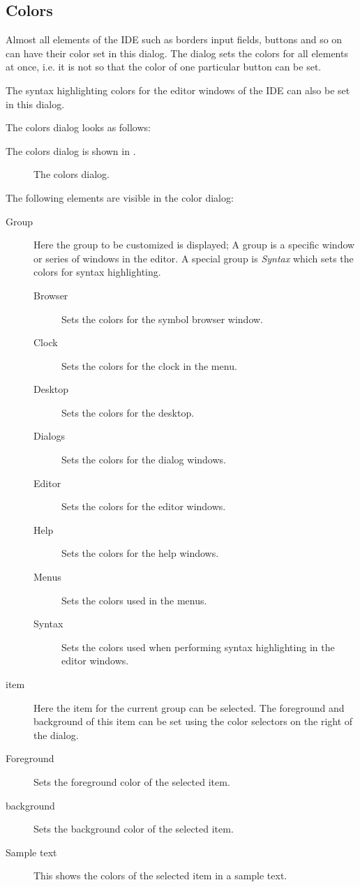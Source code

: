 %
%
\subsection{Colors}
\label{se:prefcolors}
Almost all elements of the IDE such as borders input fields, buttons and so
on can have their color set in this dialog. The dialog sets the colors for
all elements at once, i.e. it is not so that the color of one particular
button can be set.

The syntax highlighting colors for the editor windows of the IDE can also 
be set in this dialog.
\begin{htmlonly}
The colors dialog looks as follows:
\end{htmlonly}
\begin{latexonly}
The colors dialog is shown in .
\begin{figure}[ht]
\begin{center}
\caption{The colors dialog.}\label{fig:ocolors}
\ifpdf
{}
\else
{}
\fi
\end{center}
\end{figure}
\end{latexonly}
The following elements are visible in the color dialog:
\begin{description}
\item[Group]
Here the group to be customized is displayed; A group is a specific window
or series of windows in the editor. A special group is {\em Syntax} which
sets the colors for syntax highlighting.
\begin{description}
\item[Browser] Sets the colors for the symbol browser window.
\item[Clock] Sets the colors for the clock in the menu.
\item[Desktop] Sets the colors for the desktop.
\item[Dialogs] Sets the colors for the dialog windows.
\item[Editor] Sets the colors for the editor windows.
\item[Help] Sets the colors for the help windows.
\item[Menus] Sets the colors used in the menus.
\item[Syntax] Sets the colors used when performing syntax highlighting in the
editor windows.
\end{description}
\item[item]
Here the item for the current group can be selected. The foreground and
background of this item can be set using the color selectors on the right of
the dialog.
\item[Foreground]
Sets the foreground color of the selected item. 
\item[background]
Sets the background color of the selected item.
\item[Sample text]
This shows the colors of the selected item in a sample text.
\end{description}
